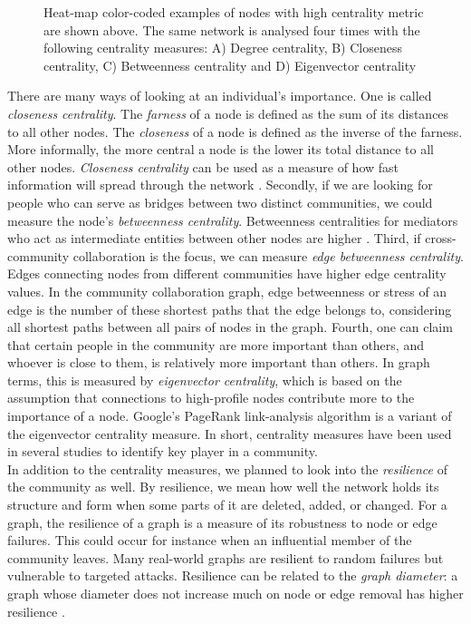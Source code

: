 \documentclass[conference]{IEEEtran}
\begin{document}
\begin{figure}[!htbp]
\centering
{}
\caption{Heat-map color-coded examples of nodes with high centrality metric are shown above. The same network is analysed four times with the following centrality measures:  A) Degree centrality, B) Closeness centrality, C) Betweenness centrality and D) Eigenvector centrality \cite{Rocchini}}
\label{figureCentrality}
\end{figure}

There are many ways of looking at an individual's importance. One is called \textit{closeness centrality}. The \textit{farness} of a node is defined as the sum of its distances to all other nodes. The \textit{closeness} of a node is defined as the inverse of the farness. More informally, the more central a node is the lower its total distance to all other nodes. \textit{Closeness centrality} can be used as a measure of how fast information will spread through the network \cite{Chakrabarti}. Secondly, if we are looking for people who can serve as bridges between two distinct communities, we could measure the node's \textit{betweenness centrality}. Betweenness centralities for mediators who act as intermediate entities between other nodes are higher \cite{Chakrabarti}.  Third, if cross-community collaboration is the focus, we can measure \textit{edge betweenness centrality}.  Edges connecting nodes from different communities have higher edge centrality values. In the community collaboration graph, edge betweenness or stress of an edge is the number of these shortest paths that the edge belongs to, considering all shortest paths between all pairs of nodes in the graph. Fourth, one can claim that certain people in the community are more important than others, and whoever is close to them, is relatively more important than others. In graph terms, this is measured by \textit{eigenvector centrality}, which is based on the assumption that connections to high-profile nodes contribute more to the importance of a node. Google's PageRank link-analysis algorithm \cite{Page} is a variant of the eigenvector centrality measure. In short, centrality measures have been used in several studies to identify key player in a community.\\


In addition to the centrality measures, we planned to look into the \textit{resilience} of the community as well. By resilience, we mean how well the network holds its structure and form when some parts of it are deleted, added, or changed. For a graph, the resilience of a graph is a measure of its robustness to node or edge failures. This could occur for instance when an influential member of the community leaves. Many real-world graphs are resilient to random failures but vulnerable to targeted attacks. Resilience can be related to the \textit{graph diameter}: a graph whose diameter does not increase much on node or edge removal has higher resilience \cite{Chakrabarti}.\\
\end{document}
